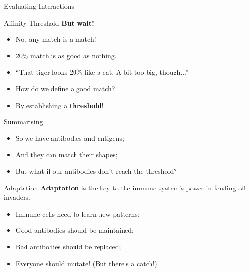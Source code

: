 \documentclass[xcolor=svgnames]{beamer}
\begin{document}
\begin{frame}{Evaluating Interactions}
		\end{frame}
		
		\begin{frame}{Affinity Threshold}
		    \textbf{But wait!}
		
		    \begin{itemize}
		        \item Not any match is a match!
		        \item 20\% match is as good as nothing.
		        \item ``That tiger looks 20\% like a cat. A bit too big, though...''
		        \item How do we define a good match?
		        \pause
		        \item By establishing a \textbf{threshold}!
		    \end{itemize}
		\end{frame}
		
		\begin{frame}{Summarising}
		    \begin{itemize}
		        \item So we have antibodies and antigens;
		        \item And they can match their shapes;
		        \item But what if our antibodies don't reach the threshold?
		    \end{itemize}
		\end{frame}
        
		\begin{frame}{Adaptation}
		    \textbf{Adaptation} is the key to the immune system's power in fending off invaders.
		
		    \begin{itemize}
		        \item Immune cells need to learn new patterns;
		        \item Good antibodies should be maintained;
		        \item Bad antibodies should be replaced;
		        \item Everyone should mutate! (But there's a catch!)
		    \end{itemize}
		\end{frame}
		
\end{document}
